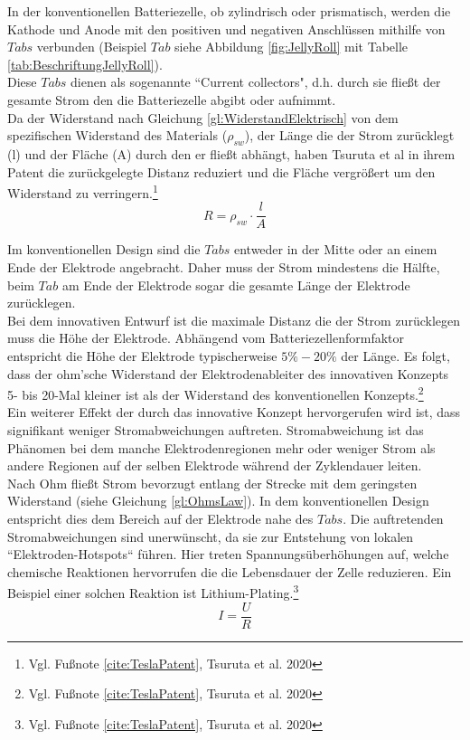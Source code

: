 In der konventionellen Batteriezelle, ob zylindrisch oder prismatisch, werden die Kathode und Anode mit den positiven und negativen Anschlüssen mithilfe von $Tabs$ verbunden (Beispiel $Tab$ siehe Abbildung \ref{fig:JellyRoll} mit Tabelle \ref{tab:BeschriftungJellyRoll}). \\
Diese $Tabs$ dienen als sogenannte ``Current collectors", d.h. durch sie fließt der gesamte Strom den die Batteriezelle abgibt oder aufnimmt. \\
Da der Widerstand nach Gleichung \ref{gl:WiderstandElektrisch} von dem spezifischen Widerstand des Materials ($\rho_{sw}$), der Länge die der Strom zurücklegt (l) und der Fläche (A) durch den er fließt abhängt, haben Tsuruta et al in ihrem Patent die zurückgelegte Distanz reduziert und die Fläche vergrößert um den Widerstand zu verringern.\footnote{Vgl. Fußnote \ref{cite:TeslaPatent}, Tsuruta et al. 2020}
\begin{equation}
	R = \rho_{sw} \cdot \frac{l}{A}
	\label{gl:WiderstandElektrisch}
\end{equation}

Im konventionellen Design sind die $Tabs$ entweder in der Mitte oder an einem Ende der Elektrode angebracht. Daher muss der Strom mindestens die Hälfte, beim $Tab$ am Ende der Elektrode sogar die gesamte Länge der Elektrode zurücklegen. \\
Bei dem innovativen Entwurf ist die maximale Distanz die der Strom zurücklegen muss die Höhe der Elektrode. Abhängend vom Batteriezellenformfaktor entspricht die Höhe der Elektrode typischerweise $5\percent-20\percent$ der Länge. Es folgt, dass der ohm'sche Widerstand der Elektrodenableiter des innovativen Konzepts 5- bis 20-Mal kleiner ist als der Widerstand des konventionellen Konzepts.\footnote{Vgl. Fußnote \ref{cite:TeslaPatent}, Tsuruta et al. 2020}\\
Ein weiterer Effekt der durch das innovative Konzept hervorgerufen wird ist, dass signifikant weniger Stromabweichungen auftreten. Stromabweichung ist das Phänomen bei dem manche Elektrodenregionen mehr oder weniger Strom als andere Regionen auf der selben Elektrode während der Zyklendauer leiten.\\
Nach Ohm fließt Strom bevorzugt entlang der Strecke mit dem geringsten Widerstand (siehe Gleichung \ref{gl:OhmsLaw}). In dem konventionellen Design entspricht dies dem Bereich auf der Elektrode nahe des $Tabs$. Die auftretenden Stromabweichungen sind unerwünscht, da sie zur Entstehung von lokalen ``Elektroden-Hotspots`` führen. Hier treten Spannungsüberhöhungen auf, welche chemische Reaktionen hervorrufen die die Lebensdauer der Zelle reduzieren. Ein Beispiel einer solchen Reaktion ist Lithium-Plating.\footnote{Vgl. Fußnote \ref{cite:TeslaPatent}, Tsuruta et al. 2020}
\begin{equation}
	I = \frac{U}{R}
	\label{gl:OhmsLaw}
\end{equation}

